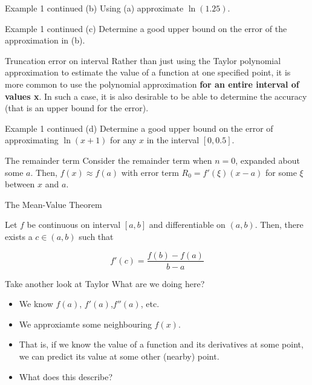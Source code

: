 \documentclass[12pt]{beamer}
\begin{document}
\begin{frame}{Example 1 continued}
(b) Using (a) approximate $\ln(1.25)$.
\vspace{3 in}
\end{frame}

\begin{frame}{Example 1 continued}
(c) Determine a good upper bound on the error of the approximation in (b). 
\vspace{3 in}
\end{frame}

\begin{frame}{Truncation error on interval} 
Rather than just using the Taylor polynomial approximation to estimate the value of a function at one specified point, it is more common to use the polynomial approximation {\bf for an entire interval of values x}. In such a case, it is also desirable to be able to determine the accuracy (that is an upper bound for the error). 
\end{frame} 

\begin{frame}{Example 1 continued}
(d) Determine a good upper bound on the error of approximating $\ln(x+1)$ for any $x$ in the interval $[0,0.5]$. 
\vspace{3 in}
\end{frame}

\begin{frame}{The remainder term}
Consider the remainder term when $n=0$, expanded about some $a$. Then, $f(x) \approx f(a)$ with error term $R_0=f'(\xi)(x-a)$ for some $\xi$ between $x$ and $a$.
\vspace{3 in}
\end{frame}

\begin{frame}{The Mean-Value Theorem}
\begin{definition}
Let $f$ be continuous on interval $[a,b]$ and differentiable on $(a,b)$. Then, there exists a $c \in (a,b)$ such that

\[
f'(c)=\frac{f(b)-f(a)}{b-a}
\]
\end{definition}
\end{frame}

\begin{frame}{Take another look at Taylor} 
What are we doing here?
\begin{itemize}
\item{We know $f(a)$, $f'(a)$,$f''(a)$, etc.}
\item{We approxiamte some neighbouring $f(x)$.}
\item{That is, if we know the value of a function and its derivatives at some point, we can predict its value at some other (nearby) point.}
\item{What does this describe?}
\end{itemize}
\end{frame} 
\end{document}
